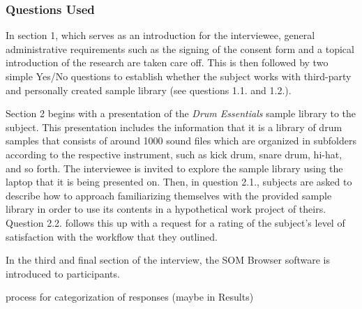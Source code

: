 \subsubsection{Questions Used}
\label{subsubsec:questions_used}
In section 1, which serves as an introduction for the interviewee, general
administrative requirements such as the signing of the consent form and a
topical introduction of the research are taken care off. This is then followed
by two simple Yes/No questions to establish whether the subject works with
third-party and personally created sample library (see questions 1.1. and 1.2.).

\smallskip

Section 2 begins with a presentation of the \textit{Drum Essentials} sample
library to the subject. This presentation includes the information that it is a
library of drum samples that consists of around 1000 sound files which are
organized in subfolders according to the respective instrument, such as kick
drum, snare drum, hi-hat, and so forth. The interviewee is invited to explore
the sample library using the laptop that it is being presented on. Then, in
question 2.1., subjects are asked to describe how to approach familiarizing
themselves with the provided sample library in order to use its contents in a
hypothetical work project of theirs. Question 2.2. follows this up with a
request for a rating of the subject's level of satisfaction with the workflow
that they outlined.

\smallskip

In the third and final section of the interview, the SOM Browser software is
introduced to participants.


\bigskip
process for categorization of responses (maybe in Results)
